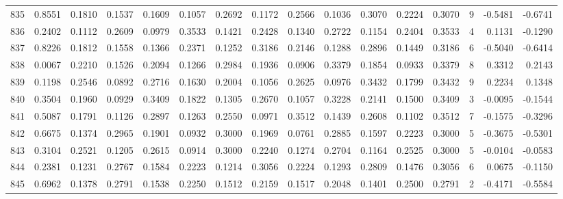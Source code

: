 \begin{tabular}{lrrrrrrrrrrrrrrr}
835 &      0.8551 &  0.1810 &  0.1537 &  0.1609 &  0.1057 &  0.2692 &  0.1172 &  0.2566 &  0.1036 &  0.3070 &   0.2224 &     0.3070 &      9 &                   -0.5481 &                    -0.6741 \\
836 &      0.2402 &  0.1112 &  0.2609 &  0.0979 &  0.3533 &  0.1421 &  0.2428 &  0.1340 &  0.2722 &  0.1154 &   0.2404 &     0.3533 &      4 &                    0.1131 &                    -0.1290 \\
837 &      0.8226 &  0.1812 &  0.1558 &  0.1366 &  0.2371 &  0.1252 &  0.3186 &  0.2146 &  0.1288 &  0.2896 &   0.1449 &     0.3186 &      6 &                   -0.5040 &                    -0.6414 \\
838 &      0.0067 &  0.2210 &  0.1526 &  0.2094 &  0.1266 &  0.2984 &  0.1936 &  0.0906 &  0.3379 &  0.1854 &   0.0933 &     0.3379 &      8 &                    0.3312 &                     0.2143 \\
839 &      0.1198 &  0.2546 &  0.0892 &  0.2716 &  0.1630 &  0.2004 &  0.1056 &  0.2625 &  0.0976 &  0.3432 &   0.1799 &     0.3432 &      9 &                    0.2234 &                     0.1348 \\
840 &      0.3504 &  0.1960 &  0.0929 &  0.3409 &  0.1822 &  0.1305 &  0.2670 &  0.1057 &  0.3228 &  0.2141 &   0.1500 &     0.3409 &      3 &                   -0.0095 &                    -0.1544 \\
841 &      0.5087 &  0.1791 &  0.1126 &  0.2897 &  0.1263 &  0.2550 &  0.0971 &  0.3512 &  0.1439 &  0.2608 &   0.1102 &     0.3512 &      7 &                   -0.1575 &                    -0.3296 \\
842 &      0.6675 &  0.1374 &  0.2965 &  0.1901 &  0.0932 &  0.3000 &  0.1969 &  0.0761 &  0.2885 &  0.1597 &   0.2223 &     0.3000 &      5 &                   -0.3675 &                    -0.5301 \\
843 &      0.3104 &  0.2521 &  0.1205 &  0.2615 &  0.0914 &  0.3000 &  0.2240 &  0.1274 &  0.2704 &  0.1164 &   0.2525 &     0.3000 &      5 &                   -0.0104 &                    -0.0583 \\
844 &      0.2381 &  0.1231 &  0.2767 &  0.1584 &  0.2223 &  0.1214 &  0.3056 &  0.2224 &  0.1293 &  0.2809 &   0.1476 &     0.3056 &      6 &                    0.0675 &                    -0.1150 \\
845 &      0.6962 &  0.1378 &  0.2791 &  0.1538 &  0.2250 &  0.1512 &  0.2159 &  0.1517 &  0.2048 &  0.1401 &   0.2500 &     0.2791 &      2 &                   -0.4171 &                    -0.5584 \\

\end{tabular}
